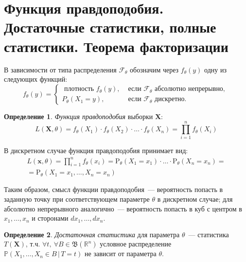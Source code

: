 \documentclass[oneside,final,14pt]{extreport}
\theoremstyle{definition}
\newtheorem{defn}{Определение}[section]
\begin{document}
\section{Функция правдоподобия. Достаточные статистики, полные статистики. Теорема факторизации}

В зависимости от типа распределения $\mathcal{F}_\theta$ обозначим через $f_{\theta}(y)$ одну из следующих функций:
\begin{equation*}
    f_{\theta}(y) =
    \left\{\begin{array}{ll}
    \text { плотность } f_{\theta}(y), & \text { если } \mathcal{F}_{\theta} \text { абсолютно непрерывно, } \\
    P_{\theta}\left(X_{1}=y\right), & \text { если } \mathcal{F}_{\theta} \text { дискретно. }
    \end{array}\right.
\end{equation*}

\begin{defn}
{\it Функция правдоподобия} выборки $\mathbf{X}$:
\begin{equation*}
    L(\mathbf{X} , \theta)=f_{\theta}\left(X_{1}\right) \cdot f_{\theta}\left(X_{2}\right) \cdot \ldots \cdot f_{\theta}\left(X_{n}\right)=\prod_{i=1}^{n} f_{\theta}\left(X_{i}\right)
\end{equation*}
\end{defn}

В дискретном случае функция правдоподобия принимает вид:
\begin{equation*}
\begin{aligned}
    L(\mathbf{x} , \theta)=\prod_{i=1}^{n} f_{\theta}(x_{i}) 
    = \mathrm{P}_{\theta}(X_{1}=x_{1}) \cdot \ldots \cdot \mathrm{P}_{\theta}(X_{n}=x_{n}) = \\
    = \mathrm{P}_{\theta}(X_{1}=x_{1}, \ldots, X_{n}=x_{n})
\end{aligned}
\end{equation*}

Таким образом, смысл функции правдоподобия~--- вероятность попасть в заданную точку при соответствующем параметре $\theta$ в дискретном случае; для абсолютно непрерывного аналогично~--- вероятность попасть в куб с центром в $x_1, \ldots, x_n$ и сторонами $dx_1, \ldots, dx_n$.

\begin{defn}
{\it Достаточная статистика} для параметра $\theta$~--- статистика $T(\mathbf{X})$, т.ч. $\forall t,~ \forall B \in \mathfrak{B}(\mathbb{R}^{n})$ условное распределение $\mathbb{P}(X_1, \ldots, X_n \in B\,|\,T=t)$ не зависит от параметра $\theta$.
\end{defn}
\end{document}
